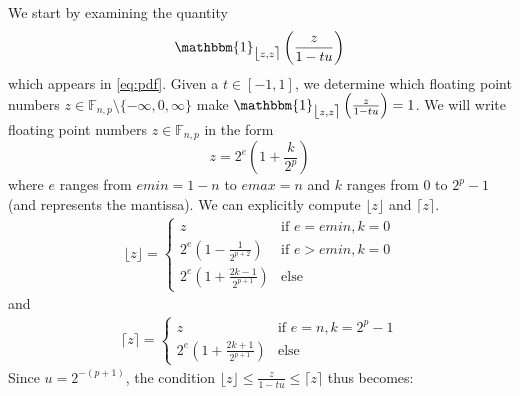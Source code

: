 \documentclass[10pt,a4paper]{article}
\theoremstyle{plain}
\theoremstyle{definition}
\newcommand{\F}[1][n,p]{\mathbb{F}_{#1}}
\newcommand{\one}{\mathbbm{1}}
\newcommand{\ceil}[1]{\lceil #1 \rceil}
\newcommand{\floor}[1]{\lfloor #1 \rfloor}
\newcommand{\fintvl}[1][x]{\mathlarger{\lfloor}#1,#1\mathlarger{\rceil}}
\begin{document}
We start by examining the quantity
\[
\one_{\fintvl[z]}\left(\frac{z}{1-tu}\right)
\]
which appears in \eqref{eq:pdf}. Given a $t\in\left[-1,1\right]$, we determine which floating point numbers $z\in\F\setminus\{-\infty,0,\infty\}$ make $\one_{\fintvl[z]}\left(\frac{z}{1-tu}\right)=1$. We will write floating point numbers $z\in\F$ in the form
\[
z=2^e\left(1+\frac{k}{2^p}\right)
\]
where $e$ ranges from $emin=1-n$ to $emax=n$ and $k$ ranges from 0 to $2^p-1$ (and represents the mantissa). We can explicitly compute $\floor{z}$ and $\ceil{z}$.
\begin{align}
\floor{z}=
\begin{cases}
z & \text{if }e=emin, k=0\\
2^{e}\left(1-\frac{1}{2^{p+2}}\right) & \text{if }e>emin, k=0\\
2^e\left(1+\frac{2k-1}{2^{p+1}}\right) & \text{else}
\end{cases}
\end{align}
and
\begin{align}
\ceil{z}=\begin{cases}
z&\text{if }e=n, k=2^p-1\\
2^e\left(1+\frac{2k+1}{2^{p+1}}\right) & \text{else}
\end{cases}
\end{align}
Since $u=2^{-(p+1)}$, the condition $\floor{z}\leq \frac{z}{1-tu}\leq \ceil{z}$ thus becomes:
\end{document}
